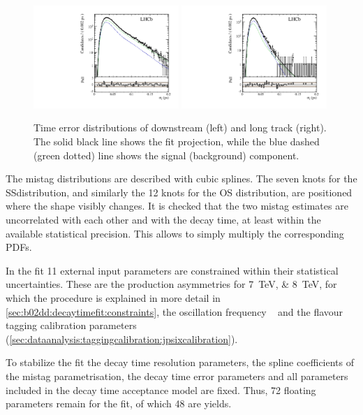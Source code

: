 \begin{figure}[htb]
\includegraphics[width=0.49\textwidth]{06-Bd2JpsiKS/figs/obsTimeError_summed_pull_log_DD.pdf}
\includegraphics[width=0.49\textwidth]{06-Bd2JpsiKS/figs/obsTimeError_summed_pull_log_LL.pdf}
\caption{
Time error distributions of downstream (left) and long track (right). The solid black line
shows the fit projection, while the blue dashed (green dotted) line shows the
signal (background) component.}
\label{fig:bd2jpsiks:nominalfit:time_error}
\end{figure}

The mistag distributions are described with cubic splines. The seven knots for
the SS\pion distribution, and similarly the 12 knots for the OS distribution,
are positioned where the shape visibly changes. It is checked that the two
mistag estimates are uncorrelated with each other and with the decay time, at
least within the available statistical precision. This allows to simply
multiply the corresponding PDFs.

In the fit 11 external input parameters are constrained within their
statistical uncertainties. These are the production asymmetries for
\SIlist{7;8}{\TeV}, for which the procedure is explained in more detail in
\cref{sec:b02dd:decaytimefit:constraints}, the oscillation frequency
\dmd~\cite{PDG2014} and the flavour tagging calibration parameters
(\cref{sec:dataanalysis:taggingcalibration:jpsixcalibration}).

To stabilize the fit the decay time resolution parameters, the spline
coefficients of the mistag parametrisation, the decay time error parameters
and all parameters included in the decay time acceptance model are fixed.
Thus, \num{72} floating parameters remain for the fit, of which \num{48} are
yields.

